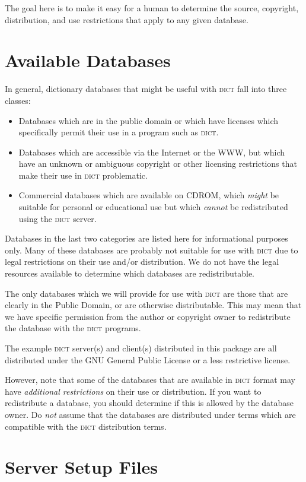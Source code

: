\documentclass{article}
\newcommand{\dict}{\textsc{dict}\xspace}
\begin{document}
The goal here is to make it easy for a human to determine the source,
copyright, distribution, and use restrictions that apply to any given
database.

\section{Available Databases}

In general, dictionary databases that might be useful with \dict fall into
three classes:
\begin{itemize}
\item Databases which are in the public domain or which have licenses which
  specifically permit their use in a program such as \dict.
\item Databases which are accessible via the Internet or the WWW, but which
  have an unknown or ambiguous copyright or other licensing restrictions
  that make their use in \dict problematic.
\item Commercial databases which are available on CDROM, which \emph{might}
  be suitable for personal or educational use but which \emph{cannot} be
  redistributed using the \dict server.
\end{itemize}

Databases in the last two categories are listed here for informational
purposes only.  Many of these databases are probably not suitable for use
with \dict due to legal restrictions on their use and/or distribution.  We
do not have the legal resources available to determine which databases are
redistributable.

The only databases which we will provide for use with \dict are those that
are clearly in the Public Domain, or are otherwise distributable.  This may
mean that we have specific permission from the author or copyright owner to
redistribute the database with the \dict programs.

The example \dict server(s) and client(s) distributed in this package are
all distributed under the GNU General Public License or a less restrictive
license.

However, note that some of the databases that are available in \dict format
may have \emph{additional restrictions} on their use or distribution.  If
you want to redistribute a database, you should determine if this is
allowed by the database owner.  Do \emph{not} assume that the databases are
distributed under terms which are compatible with the \dict distribution
terms.

\section{Server Setup Files}
\end{document}
